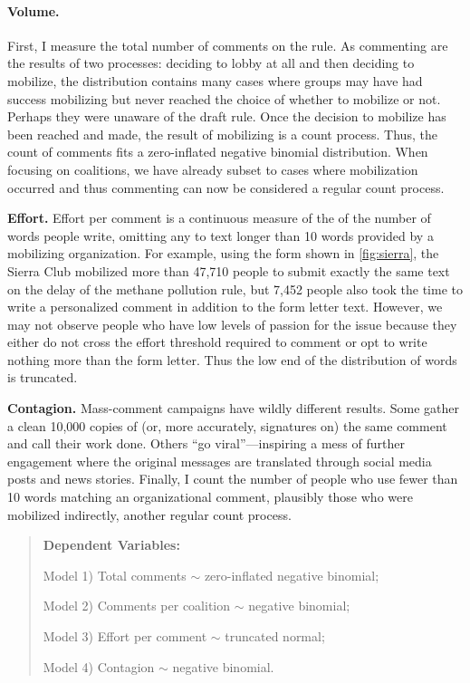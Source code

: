 \paragraph{Volume.} 
First, I measure the total number of comments on the rule. As commenting are the results of two processes: deciding to lobby at all and then deciding to mobilize, the distribution contains many cases where groups may have had success mobilizing but never reached the choice of whether to mobilize or not. Perhaps they were unaware of the draft rule. Once the decision to mobilize has been reached and made, the result of mobilizing is a count process. Thus, the count of comments fits a zero-inflated negative binomial distribution. When focusing on coalitions, we have already subset to cases where mobilization occurred and thus commenting can now be considered a regular count process. 

\textbf{Effort.} Effort per comment is a continuous measure of the of the number of words people write, omitting any to text longer than 10 words provided by a mobilizing organization. %
For example, using the form shown in \ref{fig:sierra}, the Sierra Club mobilized more than 47,710 people to submit exactly the same text on the delay of the methane pollution rule, but 7,452 people also took the time to write a personalized comment in addition to the form letter text. However, we may not observe people who have low levels of passion for the issue because they either do not cross the effort threshold required to comment or opt to write nothing more than the form letter. Thus the low end of the distribution of words is truncated.

\textbf{Contagion.} Mass-comment campaigns have wildly different results. Some gather a clean 10,000 copies of (or, more accurately, signatures on) the same comment and call their work done. Others ``go viral''---inspiring a mess of further engagement where the original messages are translated through social media posts and news stories.
Finally, I count the number of people who use fewer than 10 words matching an organizational comment, plausibly those who were mobilized indirectly, another regular count process.

\begin{quote}
\textbf{Dependent Variables:} 

Model 1) Total comments $\sim$ zero-inflated negative binomial; 

Model 2) Comments per coalition $\sim$ negative binomial; 

Model 3) Effort per comment $\sim$ truncated normal; 

Model 4) Contagion $\sim$ negative binomial. 

\end{quote}

